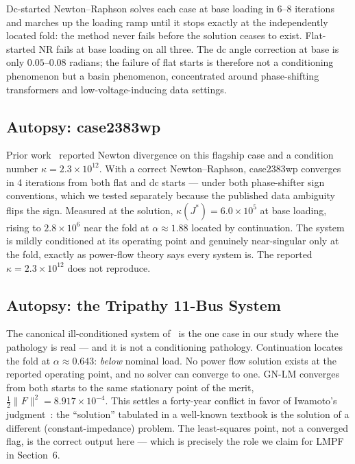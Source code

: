 \documentclass[11pt]{article}
\begin{document}
Dc-started Newton--Raphson solves each case at base loading in 6--8
iterations and marches up the loading ramp until it stops exactly at the
independently located fold: the method never fails before the solution
ceases to exist. Flat-started NR fails at base loading on all three. The dc
angle correction at base is only $0.05$--$0.08$ radians; the failure of
flat starts is therefore not a conditioning phenomenon but a basin
phenomenon, concentrated around phase-shifting transformers and
low-voltage-inducing data settings.


\subsection{Autopsy: case2383wp}

Prior work~\cite{derakhshandeh2018} reported Newton divergence on this
flagship case and a condition number $\kappa = 2.3\times10^{12}$. With a
correct Newton--Raphson, case2383wp converges in 4 iterations from both
flat and dc starts --- under both phase-shifter sign conventions, which we
tested separately because the published data ambiguity flips the sign.
Measured at the solution, $\kappa(J^*) = 6.0\times10^{5}$ at base loading,
rising to $2.8\times10^{6}$ near the fold at $\alpha \approx 1.88$ located
by continuation. The system is mildly conditioned at its operating point
and genuinely near-singular only at the fold, exactly as power-flow theory
says every system is. The reported $\kappa = 2.3\times10^{12}$ does not
reproduce.


\subsection{Autopsy: the Tripathy 11-Bus System}

The canonical ill-conditioned system of~\cite{tripathy1982} is the one case
in our study where the pathology is real --- and it is not a conditioning
pathology. Continuation locates the fold at $\alpha \approx 0.643$:
\emph{below} nominal load. No power flow solution exists at the reported
operating point, and no solver can converge to one. GN-LM converges from
both starts to the same stationary point of the merit,
$\tfrac12\|F\|^2 = 8.917\times10^{-4}$. This settles a forty-year conflict
in favor of Iwamoto's judgment~\cite{iwamoto1981}: the ``solution''
tabulated in a well-known textbook is the solution of a different
(constant-impedance) problem. The least-squares point, not a converged
flag, is the correct output here --- which is precisely the role we claim
for LMPF in Section~6.
\end{document}
